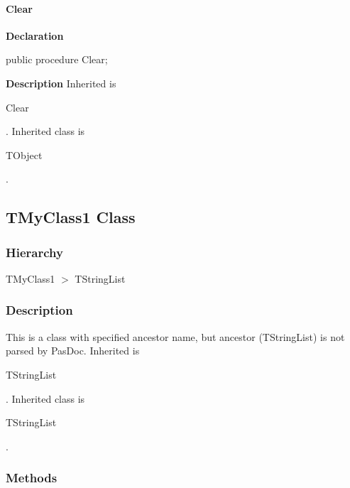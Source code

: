 \documentclass{report}
\begin{document}
\paragraph*{Clear}\hspace*{\fill}

\begin{list}{}{
\setlength{\itemindent}{0cm}
\setlength{\listparindent}{0cm}
\setlength{\leftmargin}{\evensidemargin}
\addtolength{\leftmargin}{\tmplength}
\settowidth{\labelsep}{X}
\addtolength{\leftmargin}{\labelsep}
\setlength{\labelwidth}{\tmplength}
}
\begin{flushleft}
\item[\textbf{Declaration}\hfill]
\begin{ttfamily}
public procedure Clear;\end{ttfamily}


\end{flushleft}
\par
\item[\textbf{Description}]
Inherited is \begin{ttfamily}Clear\end{ttfamily}. Inherited class is \begin{ttfamily}TObject\end{ttfamily}.

\end{list}
\subsection*{TMyClass1 Class}
\subsubsection*{\large{\textbf{Hierarchy}}\normalsize\hspace{1ex}\hfill}
TMyClass1 {$>$} TStringList
\subsubsection*{\large{\textbf{Description}}\normalsize\hspace{1ex}\hfill}
This is a class with specified ancestor name, but ancestor (TStringList) is not parsed by PasDoc. Inherited is \begin{ttfamily}TStringList\end{ttfamily}. Inherited class is \begin{ttfamily}TStringList\end{ttfamily}.\subsubsection*{\large{\textbf{Methods}}\normalsize\hspace{1ex}\hfill}
\end{document}
